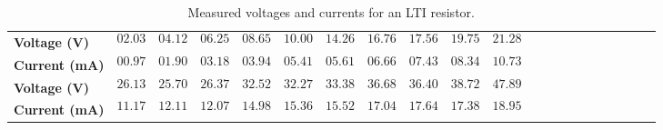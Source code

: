 \documentclass[11pt]{article}
\begin{document}

\begin{question}


    \begin{table}[H]
        \centering
        \begin{tabular}{l c c c c c c c c c c c c c c c c c c c c}
            \toprule
            \textbf{Voltage (V)}  &
            $$02.03$$             &
            $$04.12$$             &
            $$06.25$$             &
            $$08.65$$             &
            $$10.00$$             &
            $$14.26$$             &
            $$16.76$$             &
            $$17.56$$             &
            $$19.75$$             &
            $$21.28$$               \\
            \textbf{Current (mA)} &
            $$00.97$$             &
            $$01.90$$             &
            $$03.18$$             &
            $$03.94$$             &
            $$05.41$$             &
            $$05.61$$             &
            $$06.66$$             &
            $$07.43$$             &
            $$08.34$$             &
            $$10.73$$               \\
            \bottomrule
            \toprule
            \textbf{Voltage (V)}  &
            $$26.13$$             &
            $$25.70$$             &
            $$26.37$$             &
            $$32.52$$             &
            $$32.27$$             &
            $$33.38$$             &
            $$36.68$$             &
            $$36.40$$             &
            $$38.72$$             &
            $$47.89$$               \\
            \textbf{Current (mA)} &
            $$11.17$$             &
            $$12.11$$             &
            $$12.07$$             &
            $$14.98$$             &
            $$15.36$$             &
            $$15.52$$             &
            $$17.04$$             &
            $$17.64$$             &
            $$17.38$$             &
            $$18.95$$               \\
            \bottomrule
        \end{tabular}
        \caption{Measured voltages and currents for an LTI resistor.}\label{tab:Q1}
    \end{table}

    \answer{}

\end{question}
\end{document}
